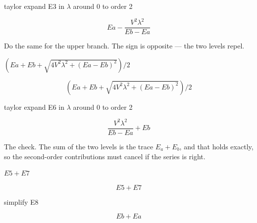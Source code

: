 \documentclass[dvipdfmx]{article}
\begin{document}
taylor expand E3 in $\lambda$ around 0 to order 2

\begin{equation}
  Ea-\frac{V^2 \lambda^2}{Eb-Ea}
  \label{eq:E5}
\end{equation}

Do the same for the upper branch. The sign is opposite — the two levels repel.

$(Ea + Eb + \sqrt{4 V^2 \lambda^2 + (Ea-Eb)^2})/2$

\begin{equation}
  (Ea + Eb + \sqrt{4 V^2 \lambda^2 + (Ea-Eb)^2})/2
  \label{eq:E6}
\end{equation}

taylor expand E6 in $\lambda$ around 0 to order 2

\begin{equation}
  \frac{V^2 \lambda^2}{Eb-Ea}+Eb
  \label{eq:E7}
\end{equation}

The check. The sum of the two levels is the trace $E_a+E_b$, and that holds exactly, so the second-order contributions must cancel if the series is right.

$E5 + E7$

\begin{equation}
  E5 + E7
  \label{eq:E8}
\end{equation}

simplify E8

\begin{equation}
  Eb+Ea
  \label{eq:E9}
\end{equation}
\end{document}
